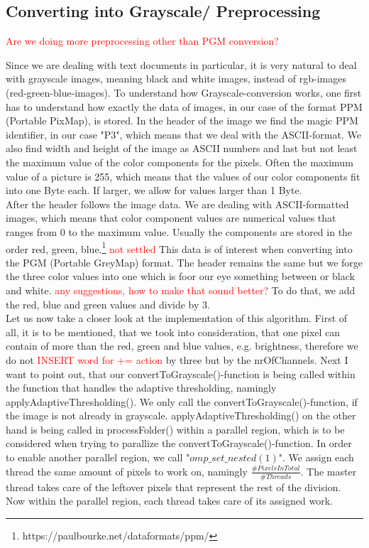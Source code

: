 \documentclass[sigconf]{acmart}
\begin{document}
\subsection{Converting into Grayscale/ Preprocessing}

\textcolor{red}{Are we doing more preprocessing other than PGM conversion?}

Since we are dealing with text documents in particular, it is very natural to deal with grayscale images, meaning black and white images, instead of rgb-images (red-green-blue-images). To understand how Grayscale-conversion works, one first has to understand how exactly the data of images, in our case of the format PPM (Portable PixMap), is stored. In the header of the image we find the magic PPM identifier, in our case "P3", which means that we deal with the ASCII-format. We also find width and height of the image as ASCII numbers and last but not least the maximum value of the color components for the pixels. Often the maximum value of a picture is 255, which means that the values of our color components fit into one Byte each. If larger, we allow for values larger than 1 Byte.\\
After the header follows the image data. We are dealing with ASCII-formatted images, which means that color component values are numerical values that ranges from 0 to the maximum value. Usually the components are stored in the order red, green, blue.\footnote{https://paulbourke.net/dataformats/ppm/} \textcolor{red}{not settled} This data is of interest when converting into the PGM (Portable GreyMap) format. The header remains the same but we forge the three color values into one which is foor our eye something between or black and white. \textcolor{red}{any suggestions, how to make that sound better?} To do that, we add the red, blue and green values and divide by 3. \\

Let us now take a closer look at the implementation of this algorithm. First of all, it is to be mentioned, that we took into consideration, that one pixel can contain of more than the red, green and blue values, e.g. brightness, therefore we do not \textcolor{red}{INSERT word for += action} by three but by the nrOfChannels. Next I want to point out, that our convertToGrayscale()-function is being called within the function that handles the adaptive thresholding, namingly applyAdaptiveThresholding(). We only call the convertToGrayscale()-function, if the image is not already in grayscale. applyAdaptiveThresholding() on the other hand is being called in processFolder() within a parallel region, which is to be considered when trying to parallize the convertToGrayscale()-function. In order to enable another parallel region, we call "$omp\_set\_nested(1)$". We assign each thread the same amount of pixels to work on, namingly $\frac{\#PixelsInTotal}{\#Threads}$. The master thread takes care of the leftover pixels that represent the rest of the division. Now within the parallel region, each thread takes care of its assigned work. 
\end{document}
